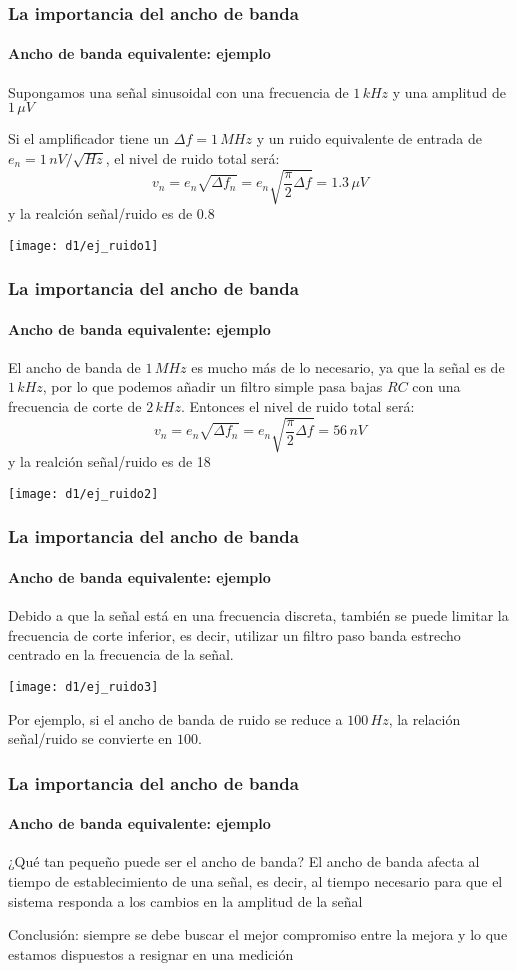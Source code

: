 \documentclass{beamer}
\begin{document}
\begin{frame}
\frametitle{La importancia del ancho de banda}
\framesubtitle{Ancho de banda equivalente: ejemplo}
Supongamos una señal sinusoidal con una frecuencia de $1\,kHz$ y una amplitud de
$1\,\mu V$ 

Si el amplificador tiene un $\Delta f = 1\,MHz$ y un ruido
equivalente de entrada de $e_n = 1\,nV/\sqrt{Hz}$, el nivel de ruido total ser\'a:
$$v_n = e_n \sqrt{\Delta f_n} = e_n \sqrt{\frac{\pi}{2}\Delta f} = 1.3\,\mu V$$
 y la realci\'on señal/ruido es de 0.8
\begin{center}
\texttt{[image: d1/ej\_ruido1]}
\end{center}
\end{frame} 

\begin{frame}
\frametitle{La importancia del ancho de banda}
\framesubtitle{Ancho de banda equivalente: ejemplo}
El ancho de banda de $1\,MHz$ es mucho m\'as de lo necesario, ya que la señal es
de $1\,kHz$, por lo que podemos añadir un filtro simple pasa bajas $RC$ con una
frecuencia de corte de $2\,kHz$. Entonces el nivel de ruido total ser\'a:
$$v_n = e_n \sqrt{\Delta f_n} = e_n \sqrt{\frac{\pi}{2}\Delta f} = 56\,nV$$
 y la realci\'on señal/ruido es de 18
\begin{center}
\texttt{[image: d1/ej\_ruido2]}
\end{center}
\end{frame} 

\begin{frame}
\frametitle{La importancia del ancho de banda}
\framesubtitle{Ancho de banda equivalente: ejemplo}
Debido a que la señal est\'a en una frecuencia discreta, tambi\'en se puede limitar la
frecuencia de corte inferior, es decir, utilizar un filtro paso banda estrecho
centrado en la frecuencia de la señal.
\begin{center}
\texttt{[image: d1/ej\_ruido3]}
\end{center}
Por ejemplo, si el ancho de banda de ruido se reduce a $100\, Hz$, la relaci\'on
señal/ruido se convierte en $100$.
\end{frame} 

\begin{frame}
\frametitle{La importancia del ancho de banda}
\framesubtitle{Ancho de banda equivalente: ejemplo}
\begin{alertblock}{¿Qu\'e tan pequeño puede ser el ancho de banda?}
{\color{blue}El ancho de banda afecta al tiempo de establecimiento de una señal, es decir, al tiempo
necesario para que el sistema responda a los cambios en la amplitud de la señal}
\end{alertblock}
\begin{alertblock}{}
Conclusi\'on: siempre se debe buscar el mejor compromiso entre la mejora y lo que
estamos dispuestos a resignar en una medici\'on
\end{alertblock}

\end{frame} 
\end{document}
